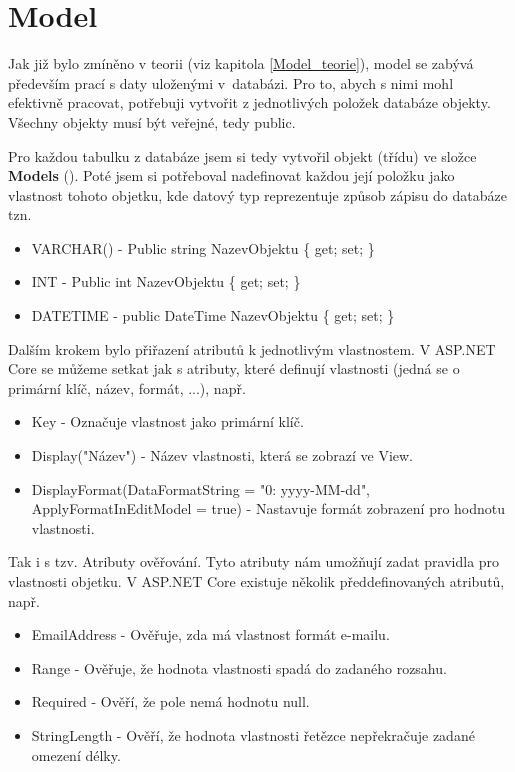 \documentclass[a4paper, 12pt]{report}
\begin{document}
	\section{Model}
	Jak již bylo zmíněno v teorii (viz kapitola \ref{Model_teorie}), model se zabývá především prací s daty uloženými v~databázi. Pro to, abych s nimi mohl efektivně pracovat, potřebuji vytvořit z jednotlivých položek databáze objekty. Všechny objekty musí být veřejné, tedy public. \par
	Pro každou tabulku z databáze jsem si tedy vytvořil objekt (třídu) ve složce \textbf{Models} (). Poté jsem si potřeboval nadefinovat každou její položku jako vlastnost tohoto objetku, kde datový typ reprezentuje způsob zápisu do databáze tzn.
	\begin{itemize}
		\item VARCHAR() - Public string NazevObjektu \{ get; set; \}
		\item INT - Public int NazevObjektu \{ get; set; \}
		\item DATETIME - public DateTime NazevObjektu \{ get; set; \}
	\end{itemize}\par
	Dalším krokem bylo přiřazení atributů k jednotlivým vlastnostem. V ASP.NET Core se můžeme setkat jak s atributy, které definují vlastnosti (jedná se o primární klíč, název, formát, ...), např.
	\begin{itemize}
		\item Key - Označuje vlastnost jako primární klíč.
		\item Display("Název") - Název vlastnosti, která se zobrazí ve View.
		\item DisplayFormat(DataFormatString = "{0: yyyy-MM-dd}", ApplyFormatInEditModel = true) - Nastavuje formát zobrazení pro hodnotu vlastnosti.
	\end{itemize}
	Tak i s tzv. Atributy ověřování. Tyto atributy nám umožňují zadat pravidla pro vlastnosti objetku. V ASP.NET Core existuje několik předdefinovaných atributů, např.
	\begin{itemize}
		\item EmailAddress - Ověřuje, zda má vlastnost formát e-mailu.
		\item Range - Ověřuje, že hodnota vlastnosti spadá do zadaného rozsahu.
		\item Required - Ověří, že pole nemá hodnotu null.
		\item StringLength - Ověří, že hodnota vlastnosti řetězce nepřekračuje zadané omezení délky.
	\end{itemize}
\end{document}
